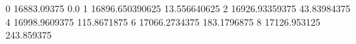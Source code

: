 0 16883.09375 0.0
1 16896.650390625 13.556640625
2 16926.93359375 43.83984375
4 16998.9609375 115.8671875
6 17066.2734375 183.1796875
8 17126.953125 243.859375
